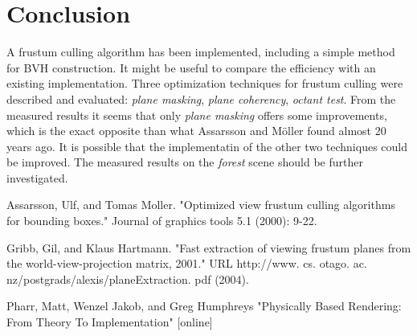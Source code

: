 \documentclass[report,11pt]{elsarticle}
\begin{document}
\section{\label{SEC:Conclusion}Conclusion}
A frustum culling algorithm has been implemented, including a simple method for BVH construction. It might be useful to compare the efficiency with an existing implementation. Three optimization techniques for frustum culling were described and evaluated: \emph{plane masking}, \emph{plane coherency}, \emph{octant test}. From the measured results it seems that only \emph{plane masking} offers some improvements, which is the exact opposite than what Assarsson and Möller \cite{Assarsson} found almost 20 years ago. It is possible that the implementatin of the other two techniques could be improved. The measured results on the \emph{forest} scene should be further investigated. 



%
%
%

\label{SEC:References}
\renewcommand\bibname{References}
\begin{thebibliography}{10}

Assarsson, Ulf, and Tomas Moller.
\newblock "Optimized view frustum culling algorithms for bounding boxes." Journal of graphics tools 5.1 (2000): 9-22.

Gribb, Gil, and Klaus Hartmann.
\newblock "Fast extraction of viewing frustum planes from the world-view-projection matrix, 2001." URL http://www. cs. otago. ac. nz/postgrads/alexis/planeExtraction. pdf (2004).

Pharr, Matt, Wenzel Jakob, and Greg Humphreys
\newblock "Physically Based Rendering: From Theory To Implementation" [online]

\end{thebibliography}
\end{document}
